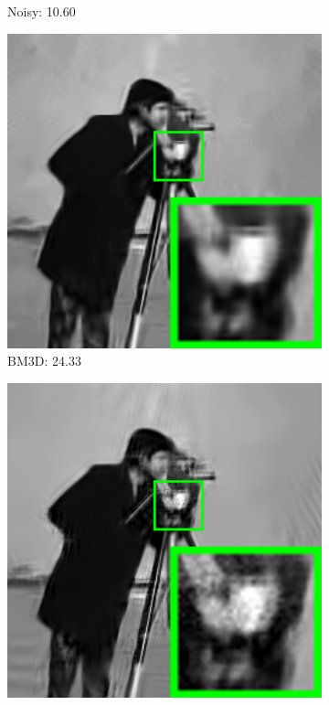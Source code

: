 \begin{figure}
\begin{subfigure}[t]{0.24\textwidth}
		\caption{Noisy: 10.60}
    \end{subfigure}
    \hfill
    \begin{subfigure}[t]{0.24\textwidth}
        \centering
        \includegraphics[width=1\textwidth]{images/pgpd/br_BM3D_75_cameraman.png}
		\caption{BM3D: 24.33}
    \end{subfigure}
    \hfill
    \begin{subfigure}[t]{0.24\textwidth}
        \centering
        \includegraphics[width=1\textwidth]{images/pgpd/br_LSSC_75_cameraman.png}

\end{subfigure}
\end{figure}

